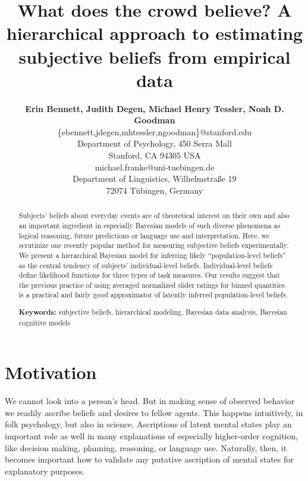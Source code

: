 \documentclass[10pt,letterpaper]{article}
\title{What does the crowd believe? A hierarchical approach to estimating subjective beliefs
  from empirical data}
\author{{\large \bf Erin Bennett, Judith Degen, Michael Henry Tessler, Noah D. Goodman}\\
     \{ebennett,jdegen,mhtessler,ngoodman\}@stanford.edu \\
     Department of Psychology, 450 Serra Mall \\
  Stanford, CA 94305 USA \AND {\large \bf Michael Franke} \\
  michael.franke@uni-tuebingen.de \\
  Department of Linguistics, Wilhelmstra\ss e 19 \\
 72074 T\"{u}bingen, Germany
  \AND}
\begin{document}
\maketitle




\begin{abstract}
  Subjects' beliefs about everyday events are of theoretical interest on their own and also an
  important ingredient in especially Bayesian models of such diverse phenomena as logical
  reasoning, future predictions or language use and interpretation. Here, we scrutinize one
  recently popular method for measuring subjective beliefs experimentally. We present a
  hierarchical Bayesian model for inferring likely ``population-level beliefs'' as the central
  tendency of subjects' individual-level beliefs. Individual-level beliefs define likelihood
  functions for three types of task measures. Our results suggest that the previous practice of
  using averaged normalized slider ratings for binned quantities is a practical and fairly good
  approximator of latently inferred population-level beliefs.

\textbf{Keywords:} subjective beliefs, hierarchical modeling, Bayesian data analysis, Bayesian
cognitive models 
\end{abstract}




\section{Motivation}

We cannot look into a person's head. But in making sense of observed behavior we readily
ascribe beliefs and desires to fellow agents. This happens intuitively, in folk psychology, but
also in science. Ascriptions of latent mental states play an important role as well in many
explanations of especially higher-order cognition, like decision making, planning, reasoning,
or language use. Naturally, then, it becomes important how to validate any putative ascription
of mental states for explanatory purposes.
\end{document}
